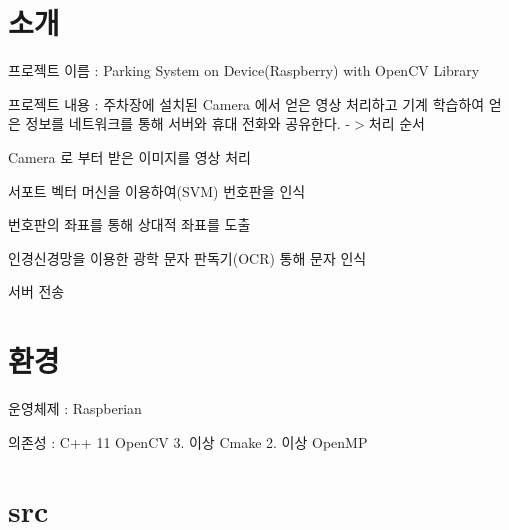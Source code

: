 \hypertarget{index_소개}{}\section{소개}\label{index_소개}

\begin{DoxyItemize}
\item 프로젝트 이름 \+: Parking System on Device(\+Raspberry) with Open\+CV Library
\item 
\item 프로젝트 내용 \+: 주차장에 설치된 Camera 에서 얻은 영상 처리하고 기계 학습하여 얻은 정보를 네트워크를 통해 서버와 휴대 전화와 공유한다. -\/$>$처리 순서
\begin{DoxyEnumerate}
\item Camera 로 부터 받은 이미지를 영상 처리
\item 서포트 벡터 머신을 이용하여(\+S\+V\+M) 번호판을 인식
\item 번호판의 좌표를 통해 상대적 좌표를 도출
\item 인경신경망을 이용한 광학 문자 판독기(\+O\+C\+R) 통해 문자 인식
\item 서버 전송
\end{DoxyEnumerate}
\end{DoxyItemize}\hypertarget{index_동작}{}\section{환경}\label{index_동작}

\begin{DoxyItemize}
\item 운영체제 \+: Raspberian
\item 의존성 \+: C++ 11 Open\+CV 3. 이상 Cmake 2. 이상 Open\+MP 
\end{DoxyItemize}\hypertarget{index_src}{}\section{src}\label{index_src}

